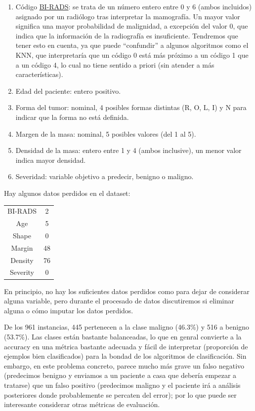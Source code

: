 \documentclass{article}
\begin{document}
\begin{enumerate}
\item Código \href{https://es.wikipedia.org/wiki/BI-RADS}{BI-RADS}: se
  trata de un número entero entre 0 y 6 (ambos incluidos) asignado por
  un radiólogo tras interpretar la mamografía. Un mayor valor
  significa una mayor probabilidad de malignidad, a excepción del
  valor 0, que indica que la información de la radiografía es
  insuficiente. Tendremos que tener esto en cuenta, ya que puede
  ``confundir'' a algunos algoritmos como el KNN, que interpretaría
  que un código 0 está más próximo a un código 1 que a un código 4, lo
  cual no tiene sentido a priori (sin atender a más características).

\item Edad del paciente: entero positivo.
\item Forma del tumor: nominal, 4 posibles formas distintas (R, O, L,
  I) y N para indicar que la forma no está definida.
\item Margen de la masa: nominal, 5 posibles valores (del 1 al 5).
\item Densidad de la masa: entero entre 1 y 4 (ambos inclusive), un
  menor valor indica mayor densidad.
\item Severidad: variable objetivo a predecir, benigno o maligno. 
\end{enumerate}

Hay algunos datos perdidos en el dataset: \vspace{-5mm}
\begin{table}[H]
  \centering
  \begin{tabular}{c|c}
    BI-RADS     & 2 \\
    Age         & 5 \\
    Shape       & 0 \\
    Margin      & 48 \\
    Density     & 76 \\
    Severity    & 0
  \end{tabular}
\end{table}
\vspace{-8mm} En principio, no hay los suficientes datos perdidos como
para dejar de considerar alguna variable, pero durante el procesado de
datos discutiremos si eliminar alguna o cómo imputar los datos
perdidos.

De los 961 instancias, 445 pertenecen a la clase maligno (46.3\%) y
516 a benigno (53.7\%). Las clases están bastante balanceadas, lo que
en genral convierte a la accuracy en una métrica bastante adecuada y
fácil de interpretar (proporción de ejemplos bien clasificados) para
la bondad de los algoritmos de clasificación. Sin embargo, en este
problema concreto, parece mucho más grave un falso negativo
(predecimos benigno y enviamos a un paciente a casa que debería
empezar a tratarse) que un falso positivo (predecimos maligno y el
paciente irá a análisis posteriores donde probablemente se percaten
del error); por lo que puede ser interesante considerar otras métricas
de evaluación.
\end{document}
